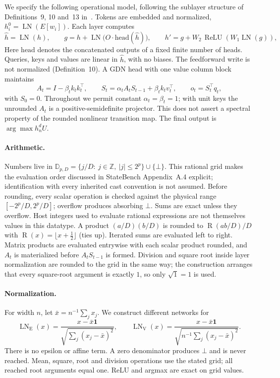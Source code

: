 \documentclass[10pt]{article}
\theoremstyle{remark}
\newcommand{\Z}{\mathbb Z}
\newcommand{\D}{\mathbb D}
\newcommand{\LN}{\operatorname{LN}}
\newcommand{\relu}{\operatorname{ReLU}}
\DeclareMathOperator{\R}{R}
\begin{document}
We specify the following operational model, following the sublayer structure
of Definitions~9, 10 and~13 in~\citet{statebench}.  Tokens are embedded and normalized, $h^0_i=\LN(E[w_i])$. Each layer computes
\[
\hat h=\LN(h),\qquad
g=h+\LN\!\big(O\cdot \mathrm{head}(\hat h)\big),\qquad
h'=g+W_2\,\relu(W_1\LN(g)),
\]
Here $\mathrm{head}$ denotes the concatenated outputs of a fixed finite
number of heads. Queries, keys and values are linear in $\hat h$, with no biases. The feedforward write is not normalized (Definition~10). A GDN head with one value column block maintains
\[
A_t=I-\beta_t k_tk_t^\top,\qquad S_t=\alpha_t A_tS_{t-1}+\beta_t k_tv_t^\top,\qquad o_t=S_t^\top q_t,
\]
with $S_0=0$. Throughout we permit constant $\alpha_t=\beta_t=1$; with unit keys the
unrounded $A_t$ is a positive-semidefinite projector. This does not assert a
spectral property of the rounded nonlinear transition map. The final output is $\arg\max h^d_nU$.

\paragraph{Arithmetic.} Numbers live in $\D_{p,D}=\{j/D:\ j\in\Z,\ |j|\le 2^p\}\cup\{\bot\}$.
This rational grid makes the evaluation order discussed in StateBench
Appendix~A.4 explicit; identification with every inherited cast convention is
not assumed. Before rounding, every scalar operation is checked against the physical
range $[-2^p/D,2^p/D]$; overflow produces absorbing $\bot$. Sums are exact
unless they overflow. Host integers used to evaluate rational expressions are
not themselves values in this datatype. A product $(a/D)(b/D)$ is rounded to $\R(ab/D)/D$ with $\R(x)=\lfloor x+\tfrac12\rfloor$ (ties up). Iterated sums are evaluated left to right. Matrix products are evaluated entrywise with each scalar product rounded, and $A_t$ is materialized before $A_tS_{t-1}$ is formed. Division and square root inside layer normalization are rounded to the grid in the same way; the construction arranges that every square-root argument is exactly $1$, so only $\sqrt{1}=1$ is used.

\paragraph{Normalization.}
For width $n$, let $\bar x=n^{-1}\sum_jx_j$. We construct different networks for
\[
\LN_{\mathrm E}(x)=\frac{x-\bar x\mathbf1}
 {\sqrt{\sum_j(x_j-\bar x)^2}},\qquad
\LN_{\mathrm V}(x)=\frac{x-\bar x\mathbf1}
 {\sqrt{n^{-1}\sum_j(x_j-\bar x)^2}}.
\]
There is no epsilon or affine term. A zero denominator produces $\bot$ and is
never reached. Mean, square, root and division operations use the stated grid;
all reached root arguments equal one. ReLU and argmax are exact on grid values.
\end{document}
